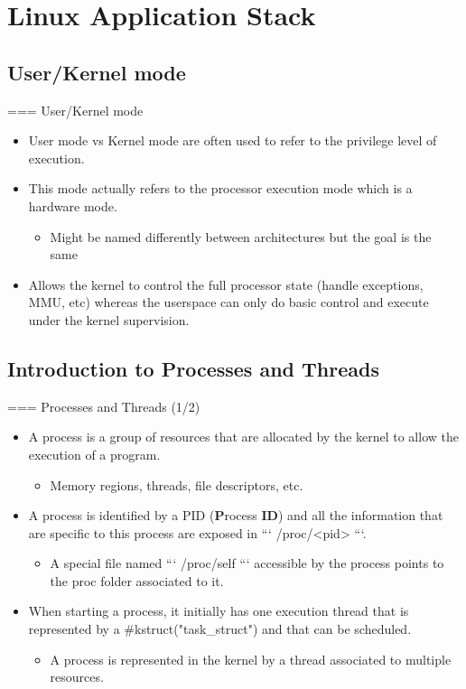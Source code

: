 \section{Linux Application Stack}

\subsection{User/Kernel mode}

=== User/Kernel mode
  \begin{itemize}
    \item User mode vs Kernel mode are often used to refer to the privilege
          level of execution.
    \item This mode actually refers to the processor execution mode which is a
          hardware mode.
    \begin{itemize}
      \item Might be named differently between architectures but the goal is
            the same
    \end{itemize}
    \item Allows the kernel to control the full processor state (handle
      exceptions, MMU, etc) whereas the userspace can only do basic control
          and execute under the kernel supervision.
  \end{itemize}


\subsection{Introduction to Processes and Threads}

=== Processes and Threads (1/2)
  \begin{itemize}
    \item A process is a group of resources that are allocated by the kernel
          to allow the execution of a program.
    \begin{itemize}
      \item Memory regions, threads, file descriptors, etc.
    \end{itemize}
    \item A process is identified by a PID ({\bf P}rocess {\bf ID}) and all the
          information that are specific to this process are exposed in
          ``` /proc/<pid> ```.
    \begin{itemize}
      \item A special file named ``` /proc/self ``` accessible by the process
            points to the proc folder associated to it.
    \end{itemize}
    \item When starting a process, it initially has one execution thread that
          is represented by a #kstruct("task_struct") and that can be scheduled.
    \begin{itemize}
      \item A process is represented in the kernel by a thread associated to
            multiple resources.
    \end{itemize}
  \end{itemize}


